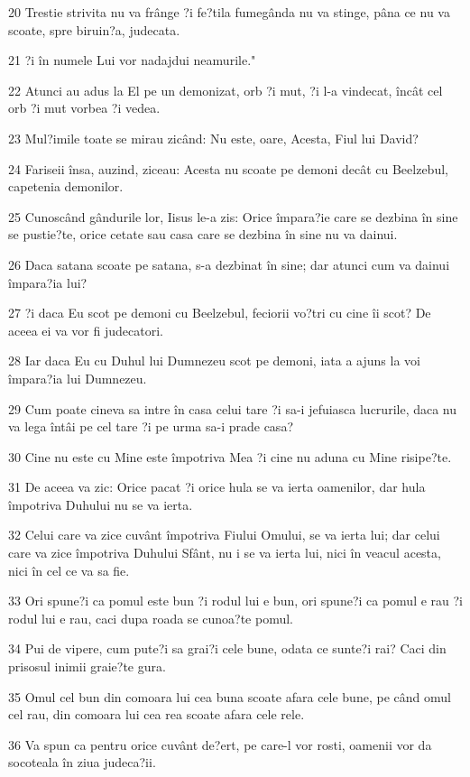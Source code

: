 \par 20 Trestie strivita nu va frânge ?i fe?tila fumegânda nu va stinge, pâna ce nu va scoate, spre biruin?a, judecata.
\par 21 ?i în numele Lui vor nadajdui neamurile."
\par 22 Atunci au adus la El pe un demonizat, orb ?i mut, ?i l-a vindecat, încât cel orb ?i mut vorbea ?i vedea.
\par 23 Mul?imile toate se mirau zicând: Nu este, oare, Acesta, Fiul lui David?
\par 24 Fariseii însa, auzind, ziceau: Acesta nu scoate pe demoni decât cu Beelzebul, capetenia demonilor.
\par 25 Cunoscând gândurile lor, Iisus le-a zis: Orice împara?ie care se dezbina în sine se pustie?te, orice cetate sau casa care se dezbina în sine nu va dainui.
\par 26 Daca satana scoate pe satana, s-a dezbinat în sine; dar atunci cum va dainui împara?ia lui?
\par 27 ?i daca Eu scot pe demoni cu Beelzebul, feciorii vo?tri cu cine îi scot? De aceea ei va vor fi judecatori.
\par 28 Iar daca Eu cu Duhul lui Dumnezeu scot pe demoni, iata a ajuns la voi împara?ia lui Dumnezeu.
\par 29 Cum poate cineva sa intre în casa celui tare ?i sa-i jefuiasca lucrurile, daca nu va lega întâi pe cel tare ?i pe urma sa-i prade casa?
\par 30 Cine nu este cu Mine este împotriva Mea ?i cine nu aduna cu Mine risipe?te.
\par 31 De aceea va zic: Orice pacat ?i orice hula se va ierta oamenilor, dar hula împotriva Duhului nu se va ierta.
\par 32 Celui care va zice cuvânt împotriva Fiului Omului, se va ierta lui; dar celui care va zice împotriva Duhului Sfânt, nu i se va ierta lui, nici în veacul acesta, nici în cel ce va sa fie.
\par 33 Ori spune?i ca pomul este bun ?i rodul lui e bun, ori spune?i ca pomul e rau ?i rodul lui e rau, caci dupa roada se cunoa?te pomul.
\par 34 Pui de vipere, cum pute?i sa grai?i cele bune, odata ce sunte?i rai? Caci din prisosul inimii graie?te gura.
\par 35 Omul cel bun din comoara lui cea buna scoate afara cele bune, pe când omul cel rau, din comoara lui cea rea scoate afara cele rele.
\par 36 Va spun ca pentru orice cuvânt de?ert, pe care-l vor rosti, oamenii vor da socoteala în ziua judeca?ii.
